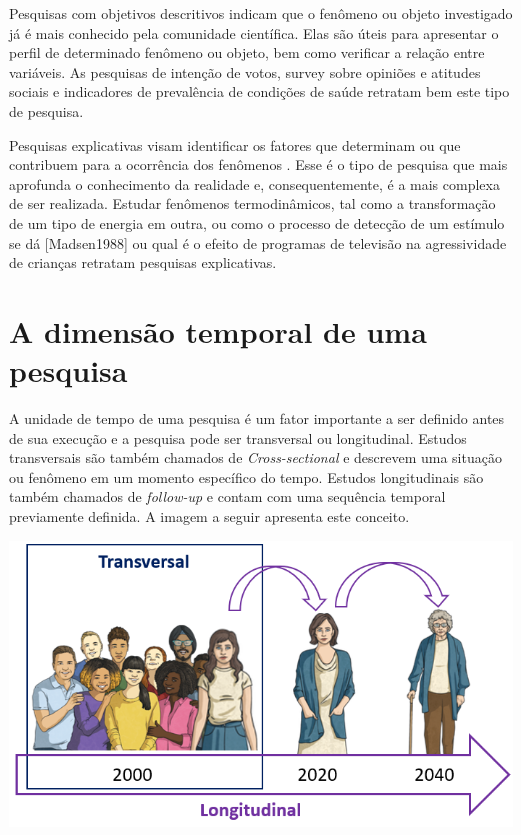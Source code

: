 \documentclass[
]{book}
\begin{document}
Pesquisas com objetivos descritivos indicam que o fenômeno ou objeto investigado já é mais conhecido pela comunidade científica. Elas são úteis para apresentar o perfil de determinado fenômeno ou objeto, bem como verificar a relação entre variáveis. As pesquisas de intenção de votos, survey sobre opiniões e atitudes sociais e indicadores de prevalência de condições de saúde retratam bem este tipo de pesquisa.

Pesquisas explicativas visam identificar os fatores que determinam ou que contribuem para a ocorrência dos fenômenos \citep{gil2002}. Esse é o tipo de pesquisa que mais aprofunda o conhecimento da realidade e, consequentemente, é a mais complexa de ser realizada. Estudar fenômenos termodinâmicos, tal como a transformação de um tipo de energia em outra, ou como o processo de detecção de um estímulo se dá {[}Madsen1988{]} ou qual é o efeito de programas de televisão na agressividade de crianças \citeyearpar{Bandura1961} retratam pesquisas explicativas.

\hypertarget{a-dimensuxe3o-temporal-de-uma-pesquisa}{%
\section{A dimensão temporal de uma pesquisa}\label{a-dimensuxe3o-temporal-de-uma-pesquisa}}

A unidade de tempo de uma pesquisa é um fator importante a ser definido antes de sua execução e a pesquisa pode ser transversal ou longitudinal. Estudos transversais são também chamados de \emph{Cross-sectional} e descrevem uma situação ou fenômeno em um momento específico do tempo. Estudos longitudinais são também chamados de \emph{follow-up} e contam com uma sequência temporal previamente definida. A imagem a seguir apresenta este conceito.

\includegraphics{./img/cap_transversal_longitudinal.png}
\end{document}
